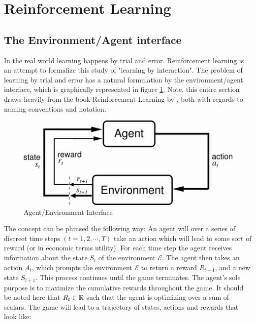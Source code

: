 \section{Reinforcement Learning}
\label{sec:rl_theory}

\subsection{The Environment/Agent interface}

In the real world learning happens by trial and error. Reinforcement learning is an attempt to formalize this study of "learning by interaction". The problem of learning by trial and error has a natural formulation by the environment/agent interface, which is graphically represented in figure \ref{fig:agent_enviroment_interface}. Note, this entire section draws heavily from the book Reinforcement Learning by \textcite{sutton_reinforcement_2018}, both with regards to naming conventions and notation.

\begin{figure}
    \centering
    \includegraphics[scale=0.35]{figures/agent_environment_interface.png}
    \caption{Agent/Environment Interface}
    \label{fig:agent_enviroment_interface}
\end{figure}

The concept can be phrased the following way: An agent will over a series of discreet time steps $(t=1, 2, \cdots, T)$ take an action which will lead to some sort of reward (or in economic terms utility). For each time step the agent receives information about the state $S_t$ of the environment $\mathcal{E}$. The agent then takes an action $A_t$, which prompts the environment $\mathcal{E}$  to return a reward $R_{t+1}$, and a new state $S_{t+1}$. This process continues until the game terminates. The agent's sole purpose is to maximize the cumulative rewards throughout the game. It should be noted here that $R_t \in \mathbb{R}$ such that the agent is optimizing over a sum of scalars. The game will lead to a trajectory of states, actions and rewards that look like:

